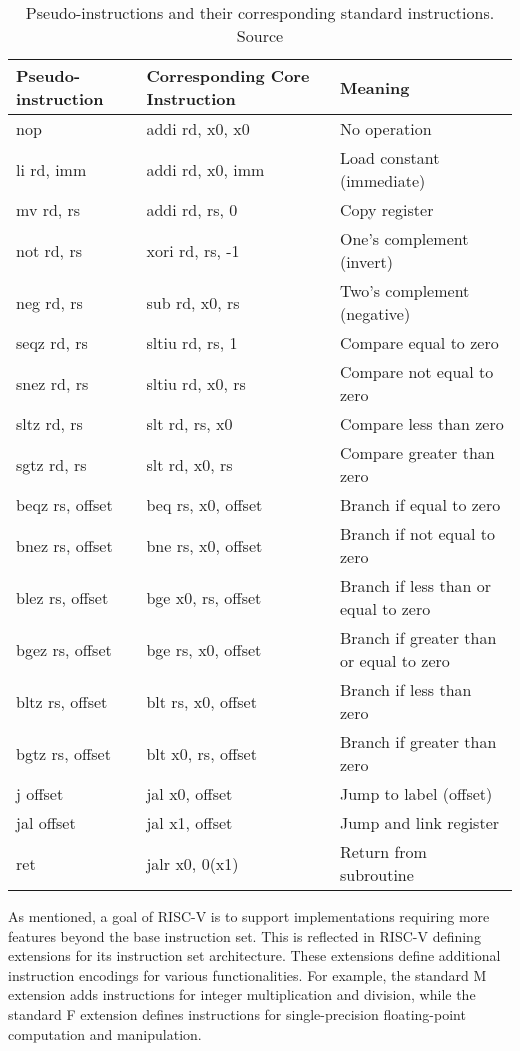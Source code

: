\begin{table}[h!]
    \centering
    \caption{Pseudo-instructions and their corresponding standard instructions. Source \cite{waterman2014riscv}}
    \label{tab:pseudo_instructions}
    \begin{tabular}{lll}
    \toprule
    \textbf{Pseudo-instruction} & \textbf{Corresponding Core Instruction} & \textbf{Meaning} \\
    \midrule
    nop & addi rd, x0, x0 & No operation \\
    li rd, imm & addi rd, x0, imm & Load constant (immediate) \\
    mv rd, rs & addi rd, rs, 0 & Copy register \\
    not rd, rs & xori rd, rs, -1 & One's complement (invert) \\
    neg rd, rs & sub rd, x0, rs & Two's complement (negative) \\
    seqz rd, rs & sltiu rd, rs, 1 & Compare equal to zero \\
    snez rd, rs & sltiu rd, x0, rs & Compare not equal to zero \\
    sltz rd, rs & slt rd, rs, x0 & Compare less than zero \\
    sgtz rd, rs & slt rd, x0, rs & Compare greater than zero \\
    beqz rs, offset & beq rs, x0, offset & Branch if equal to zero \\
    bnez rs, offset & bne rs, x0, offset & Branch if not equal to zero \\
    blez rs, offset & bge x0, rs, offset & Branch if less than or equal to zero \\
    bgez rs, offset & bge rs, x0, offset & Branch if greater than or equal to zero \\
    bltz rs, offset & blt rs, x0, offset & Branch if less than zero \\
    bgtz rs, offset & blt x0, rs, offset & Branch if greater than zero \\
    j offset & jal x0, offset & Jump to label (offset) \\
    jal offset & jal x1, offset & Jump and link register \\
    ret & jalr x0, 0(x1) & Return from subroutine \\
    \bottomrule
    \end{tabular}
\end{table}

As mentioned, a goal of RISC-V is to support implementations requiring more features beyond the base instruction set. This is reflected in RISC-V defining extensions \cite{waterman2014riscv} for its instruction set architecture. These extensions define additional instruction encodings for various functionalities. For example, the standard M extension adds instructions for integer multiplication and division, while the standard F extension defines instructions for single-precision floating-point computation and manipulation.


